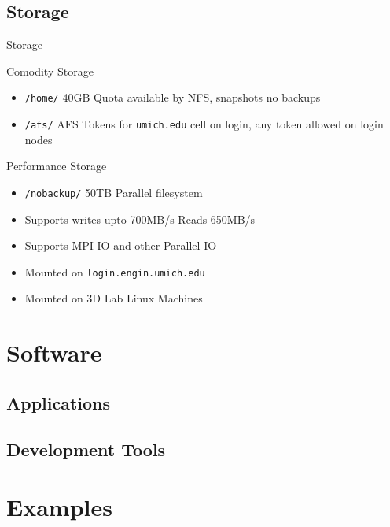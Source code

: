 \documentclass[handout]{beamer}
\begin{document}
   \subsection{Storage}
    \begin{frame}{Storage}
     \begin{block}{Comodity Storage}
      \begin{itemize}
       \item \texttt{/home/} 40GB Quota available by NFS, snapshots no backups
       \item \texttt{/afs/} AFS Tokens for \texttt{umich.edu} cell on login, any token allowed on login nodes
      \end{itemize}
     \end{block}
     \begin{block}{Performance Storage}
      \begin{itemize}
        \item \texttt{/nobackup/} 50TB Parallel filesystem
        \item Supports writes upto 700MB/s Reads 650MB/s
        \item Supports MPI-IO and other Parallel IO
        \item Mounted on \texttt{login.engin.umich.edu}
        \item Mounted on 3D Lab Linux Machines
      \end{itemize}
     \end{block}
    \end{frame}
  \section {Software}
    \subsection{Applications}
    \subsection {Development Tools}
  \section{Examples}
\end{document}
